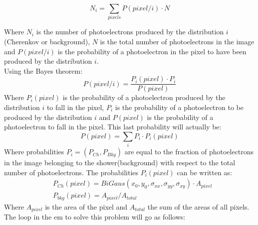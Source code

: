 \documentclass[main.tex]{subfiles}
\begin{document}
\begin{equation}
  N_{i} = \sum_{pixels} P(pixel/i)\cdot N
\end{equation}

Where $N_i$ is the number of photoelectrons produced by the distribution $i$ (Cherenkov or background), $N$ is the total number of photoelectrons in the image and $P(pixel/i)$ is the probability of a photoelectron in the pixel to have been produced by the distribution $i$.\\
Using the Bayes theorem:
\begin{equation}\label{eq:bayes}
  P(pixel/i) = \frac{P_i(pixel) \cdot P_i}{P(pixel)}
\end{equation}
Where $P_i(pixel)$ is the probability of a photoelectron produced by the distribution $i$ to fall in the pixel, $P_i$ is the probability of a photoelectron to be produced by the distribution $i$ and $P(pixel)$ is the probability of a photoelectron to fall in the pixel. This last probability will actually be:
\begin{equation}
  P(pixel) = \sum_{i} P_i \cdot P_i(pixel)
\end{equation}
Where probabilities $P_i=(P_{Ch}, P_{Bkg})$ are equal to the fraction of photoelectrons in the image belonging to the shower(background) with respect to the total number of photoelectrons. The probabilities $P_i(pixel)$ can be written as:
\begin{equation}
  \begin{split}
    & P_{Ch}(pixel) = BiGaus(x_{0}, y_{0},\sigma_{xx}, \sigma_{yy}, \sigma_{xy}) \cdot A_{pixel}\\
    & P_{bkg}(pixel) = A_{pixel}/A_{total}
  \end{split}
\end{equation}
Where $A_{pixel}$ is the area of the pixel and $A_{total}$ the sum of the areas of all pixels.\\
The loop in the \gls{em} to solve this problem will go as follows:
\end{document}
